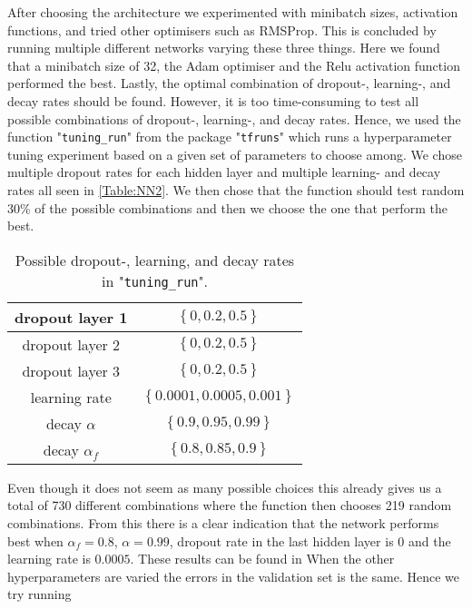 After choosing the architecture we experimented with minibatch sizes, activation functions, and tried other optimisers such as RMSProp. This is concluded by running multiple different networks varying these three things. Here we found that a minibatch size of 32, the Adam optimiser and the Relu activation function performed the best. Lastly, the optimal combination of dropout-, learning-, and decay rates should be found. However, it is too time-consuming to test all possible combinations of dropout-, learning-, and decay rates. Hence, we used the function "\lstinline{tuning_run}" from the package "\lstinline{tfruns}" which runs a hyperparameter tuning experiment based on a given set of parameters to choose among. We chose multiple dropout rates for each hidden layer and multiple learning- and decay rates all seen in \autoref{Table:NN2}. We then chose that the function should test random 30\% of the possible combinations and then we choose the one that perform the best.
\begin{table}[H]
    \centering
    {\renewcommand{\arraystretch}{1.25}\begin{tabular}{c|c}
        dropout layer 1   & $\left\{0, 0.2, 0.5 \right\}$\\ \hline
        dropout layer 2  &  $\left\{0, 0.2, 0.5\right\}$\\ \hline
        dropout layer 3  &  $\left\{0, 0.2, 0.5\right\}$\\ \hline
        learning rate &  $\left\{0.0001, 0.0005, 0.001\right\}$\\ \hline
        decay $\alpha$ &  $\left\{0.9, 0.95, 0.99\right\}$\\ \hline
        decay $\alpha_f$ &  $\left\{0.8, 0.85, 0.9\right\}$\\ 
    \end{tabular}}
    \caption{Possible dropout-, learning, and decay rates in "\lstinline{tuning_run}".}
    \label{Table:NN2}
\end{table}

Even though it does not seem as many possible choices this already gives us a total of 730 different combinations where the function then chooses 219 random combinations. From this there is a clear indication that the network performs best when $\alpha_f = 0.8$, $\alpha = 0.99$, dropout rate in the last hidden layer is $0$ and the learning rate is $0.0005$. These results can be found in  When the other hyperparameters are varied the errors in the validation set is the same. Hence we try running 



